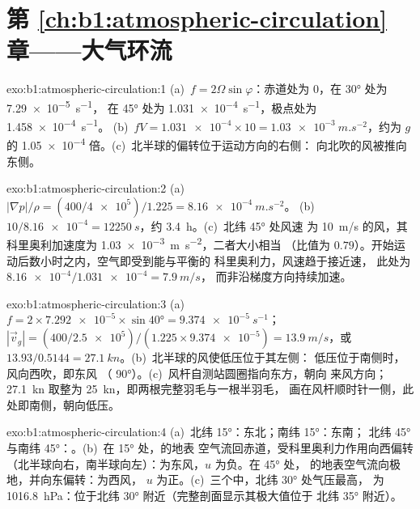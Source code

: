 \section*{第 \ref{ch:b1:atmospheric-circulation} 章——大气环流}

\begin{solution}{exo:b1:atmospheric-circulation:1}
(a)~$f = 2\Omega\sin\varphi$：赤道处为 $0$，在 \ang{30} 处为 \qty{7.29e-5}{s^{-1}}，
在 \ang{45} 处为 \qty{1.031e-4}{s^{-1}}，极点处为 \qty{1.458e-4}{s^{-1}}。
(b)~$fV = \num{1.031e-4} \times 10 = \qty{1.03e-3}{m.s^{-2}}$，约为
$g$ 的 \num{1.05e-4} 倍。(c)~北半球的偏转位于运动方向的右侧：
向北吹的风被推向东侧。
\end{solution}

\begin{solution}{exo:b1:atmospheric-circulation:2}
(a)~$|\nabla p|/\rho = (400/\num{4e5})/1.225 = \qty{8.16e-4}{m.s^{-2}}$。
(b)~$10/\num{8.16e-4} = \qty{12250}{s}$，约 \qty{3.4}{h}。(c)~北纬 \ang{45} 处风速
为 \qty{10}{m/s} 的风，其科里奥利加速度为 \qty{1.03e-3}{m.s^{-2}}，二者大小相当
（比值为 $0.79$）。开始运动后数小时之内，空气即受到能与平衡的
科里奥利力，风速趋于接近速，
此处为 $\num{8.16e-4}/\num{1.031e-4} = \qty{7.9}{m/s}$，
而非沿梯度方向持续加速。
\end{solution}

\begin{solution}{exo:b1:atmospheric-circulation:3}
(a)~$f = 2 \times \num{7.292e-5} \times \sin\ang{40} = \qty{9.374e-5}{s^{-1}}$；
$|\vec v_g| = (400/\num{2.5e5})/(1.225 \times \num{9.374e-5}) = \qty{13.9}{m/s}$，或
$13.93/0.5144 = \qty{27.1}{kn}$。(b)~北半球的风使低压位于其左侧：
低压位于南侧时，风向西吹，即东风
（ \ang{90}）。(c)~风杆自测站圆圈指向东方，朝向
来风方向；\qty{27.1}{kn} 取整为 \qty{25}{kn}，即两根完整羽毛与一根半羽毛，
画在风杆顺时针一侧，此处即南侧，朝向低压。
\end{solution}

\begin{solution}{exo:b1:atmospheric-circulation:4}
(a)~北纬 \ang{15}：东北；南纬 \ang{15}：东南；
北纬 \ang{45} 与南纬 \ang{45}：。(b)~在 \ang{15} 处，的地表
空气流回赤道，受科里奥利力作用向西偏转
（北半球向右，南半球向左）：为东风，$u$ 为负。在 \ang{45} 处，
的地表空气流向极地，并向东偏转：为西风，
$u$ 为正。(c)~三个中，北纬 \ang{30} 处气压最高，
为 \qty{1016.8}{hPa}：位于北纬 \ang{30} 附近（完整剖面显示其极大值位于
北纬 \ang{35} 附近）。
\end{solution}

